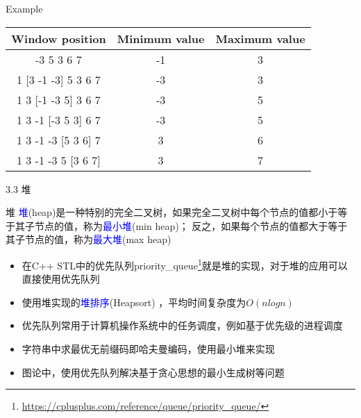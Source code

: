 \begin{frame}{Example}
    \begin{table}
        \centering
        \begin{tabular}{ccc}
            \hline
            Window position & Minimum value & Maximum value\\
            \hline
            [1 3 -1] -3 5 3 6 7 & -1 & 3 \\
            1 [3 -1 -3] 5 3 6 7	& -3 & 3 \\
            1 3 [-1 -3 5] 3 6 7	& -3 & 5 \\ 
            1 3 -1 [-3 5 3] 6 7	& -3 & 5 \\
            1 3 -1 -3 [5 3 6] 7	& 3 & 6 \\
            1 3 -1 -3 5 [3 6 7]	& 3 & 7 \\
            \hline
        \end{tabular}
    \end{table}
\end{frame}
\begin{frame}{3.3 堆}
    \begin{block}{堆}
        \textcolor{blue}{堆}(heap)是一种特别的完全二叉树，如果完全二叉树中每个节点的值都小于等于其子节点的值，称为\textcolor{blue}{最小堆}(min heap)； 反之，如果每个节点的值都大于等于其子节点的值，称为\textcolor{blue}{最大堆}(max heap)
    \end{block}
    \begin{itemize}
        \item 在C++ STL中的优先队列priority\_queue\footnote{\url{https://cplusplus.com/reference/queue/priority_queue/}}就是堆的实现，对于堆的应用可以直接使用优先队列
        \item 使用堆实现的\textcolor{blue}{堆排序}(Heapsort) ，平均时间复杂度为$O(nlogn)$
        \item 优先队列常用于计算机操作系统中的任务调度，例如基于优先级的进程调度
        \item 字符串中求最优无前缀码即哈夫曼编码，使用最小堆来实现
        \item 图论中，使用优先队列解决基于贪心思想的最小生成树等问题
    \end{itemize}
\end{frame} 
